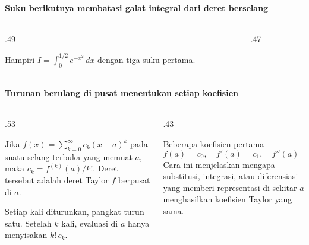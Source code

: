 \documentclass{../../kalkulus-ppt}
\begin{document}
\begin{frame}{\insertsection}
    \framesubtitle{Suku berikutnya membatasi galat integral dari deret berselang}
    \begin{columns}[c,onlytextwidth]
        \begin{column}{.49\textwidth}
            \begin{contoh}
                Hampiri $I=\int_0^{1/2}e^{-x^2}\,dx$
                dengan tiga suku pertama.
            \end{contoh}
        \end{column}
        \begin{column}{.47\textwidth}
        \end{column}
    \end{columns}
\end{frame}

\begin{frame}{\insertsection}
    \framesubtitle{Turunan berulang di pusat menentukan setiap koefisien}
    \begin{columns}[c,onlytextwidth]
        \begin{column}{.53\textwidth}
            \begin{teorema}
                Jika $f(x)=\sum_{k=0}^\infty c_k(x-a)^k$
                pada suatu selang terbuka yang memuat $a$,
                maka $c_k=f^{(k)}(a)/k!$. Deret tersebut
                adalah deret Taylor $f$ berpusat di $a$.
            \end{teorema}
            Setiap kali diturunkan, pangkat turun satu.
            Setelah $k$ kali, evaluasi di $a$ hanya menyisakan $k!\,c_k$.
        \end{column}
        \begin{column}{.43\textwidth}
            \begin{block}{Beberapa koefisien pertama}
                \[
                    f(a)=c_0,\quad f'(a)=c_1,\quad
                    f''(a)=2!\,c_2.
                \]
                Cara ini menjelaskan mengapa substitusi,
                integrasi, atau diferensiasi yang memberi
                representasi di sekitar $a$ menghasilkan
                koefisien Taylor yang sama.
            \end{block}
        \end{column}
    \end{columns}
\end{frame}
\end{document}

